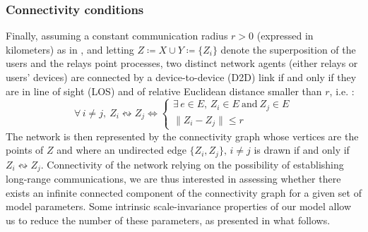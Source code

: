 \documentclass[conference]{IEEEtran}
\begin{document}
\subsubsection{Connectivity conditions}
\indent Finally, assuming a constant communication radius $r >0$ (expressed in kilometers) as in \cite{glauche_continuum_2003}, and letting $Z \coloneqq X \cup Y \coloneqq \lbrace Z_{i} \rbrace$ denote the superposition of the users and the relays point processes, two distinct network agents (either relays or users' devices) are connected by a device-to-device (D2D) link if and only if they are in line of sight (LOS) and of relative Euclidean distance smaller than $r$, i.e. :
\begin{equation}
\label{connectivity_mechanism}
\forall \, i \neq j, \: Z_{i} \leftrightsquigarrow Z_{j} \Leftrightarrow 
\left\{
\begin{array}{l}
\exists \, e \in E, \, Z_{i} \in E  \  \text{and} \  Z_{j} \in E \\
\lVert Z_{i} - Z_{j} \rVert \leq r
\end{array}
\right.
\end{equation}
\indent The network is then represented by the connectivity graph 
whose vertices are the points of $Z$ and where an undirected edge $\lbrace Z_{i},Z_{j}\rbrace, \, i \neq j $ is drawn if and only if $Z_{i} \leftrightsquigarrow Z_{j}$. Connectivity of the network relying on the possibility of establishing long-range communications, we are thus interested in assessing whether there exists an infinite connected component of the connectivity graph for a given set of model parameters.
Some intrinsic scale-invariance  properties of our model allow us to reduce the number of these parameters, as presented in what follows. \\
\end{document}
